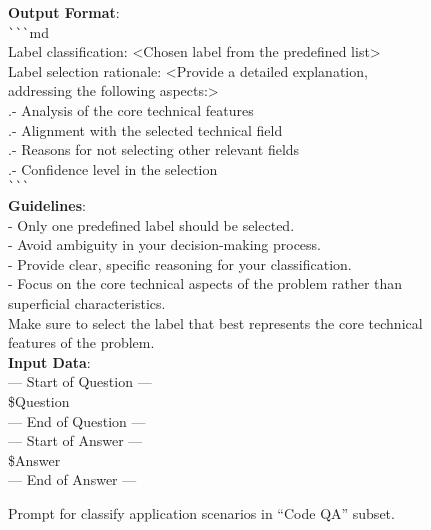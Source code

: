 \documentclass[11pt, a4paper, logo, copyright, nonumbering, amsart]{map}
\begin{document}
\begin{CJK*}{UTF8}{gbsn}
\begin{figure*}[h!]
\begin{center}
\begin{tcolorbox}[width=1\textwidth, colback=lightblue, title={\textbf{Prompt for Classify Application Scenarios in ``Code QA'' Subset}}]
    \textbf{Output Format}:\\
    \verb|```|md\\
    Label classification: <Chosen label from the predefined list>\\
    Label selection rationale: <Provide a detailed explanation, addressing the following aspects:>\\
    .\quad- Analysis of the core technical features\\
    .\quad- Alignment with the selected technical field\\
    .\quad- Reasons for not selecting other relevant fields\\
    .\quad- Confidence level in the selection\\
    \verb|```|\\
    
    \textbf{Guidelines}:\\
    - Only one predefined label should be selected.\\
    - Avoid ambiguity in your decision-making process.\\
    - Provide clear, specific reasoning for your classification.\\
    - Focus on the core technical aspects of the problem rather than superficial characteristics.\\
    Make sure to select the label that best represents the core technical features of the problem.\\

    \textbf{Input Data}:\\
    --- Start of Question ---\\
    \textcolor{ora}{\$Question}\\
    --- End of Question ---\\
    
    --- Start of Answer ---\\
    \textcolor{ora}{\$Answer}\\
    --- End of Answer ---\\
    \end{tcolorbox}
\end{center}
\caption{Prompt for classify application scenarios in ``Code QA'' subset.} \label{ap:prompt_real_classify}
\end{figure*}

\begin{figure*}[h!]
\begin{center}
    \fontsize{8.4}{8.4} \selectfont
    \begin{tcolorbox}[width=1\textwidth, colback=lightblue, title={\textbf{Fine-Grained Checklists Generation Prompt for ``Code Gen'' Subset}}]


\end{tcolorbox}
\end{center}
\end{figure*}
\end{CJK*}
\end{document}
